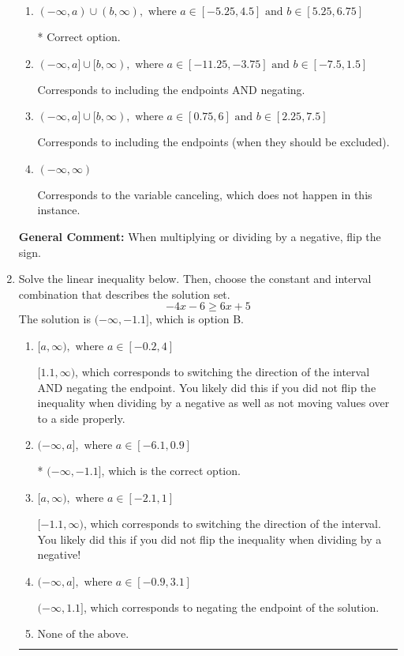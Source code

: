 \documentclass{extbook}[14pt]
\newcommand{\litem}[1]{\item #1

\rule{\textwidth}{0.4pt}}
\begin{document}
\begin{enumerate}
{\begin{enumerate}[label=\Alph*.]
Corresponds to inverting the inequality and negating the solution.
\item \( (-\infty, a) \cup (b, \infty), \text{ where } a \in [-5.25, 4.5] \text{ and } b \in [5.25, 6.75] \)

 * Correct option.
\item \( (-\infty, a] \cup [b, \infty), \text{ where } a \in [-11.25, -3.75] \text{ and } b \in [-7.5, 1.5] \)

Corresponds to including the endpoints AND negating.
\item \( (-\infty, a] \cup [b, \infty), \text{ where } a \in [0.75, 6] \text{ and } b \in [2.25, 7.5] \)

Corresponds to including the endpoints (when they should be excluded).
\item \( (-\infty, \infty) \)

Corresponds to the variable canceling, which does not happen in this instance.
\end{enumerate}

\textbf{General Comment:} When multiplying or dividing by a negative, flip the sign.
}
\litem{
Solve the linear inequality below. Then, choose the constant and interval combination that describes the solution set.
\[ -4x -6 \geq 6x + 5 \]The solution is \( (-\infty, -1.1] \), which is option B.\begin{enumerate}[label=\Alph*.]
\item \( [a, \infty), \text{ where } a \in [-0.2, 4] \)

 $[1.1, \infty)$, which corresponds to switching the direction of the interval AND negating the endpoint. You likely did this if you did not flip the inequality when dividing by a negative as well as not moving values over to a side properly.
\item \( (-\infty, a], \text{ where } a \in [-6.1, 0.9] \)

* $(-\infty, -1.1]$, which is the correct option.
\item \( [a, \infty), \text{ where } a \in [-2.1, 1] \)

 $[-1.1, \infty)$, which corresponds to switching the direction of the interval. You likely did this if you did not flip the inequality when dividing by a negative!
\item \( (-\infty, a], \text{ where } a \in [-0.9, 3.1] \)

 $(-\infty, 1.1]$, which corresponds to negating the endpoint of the solution.
\item \( \text{None of the above}. \)


\end{enumerate}}
\end{enumerate}
\end{document}
